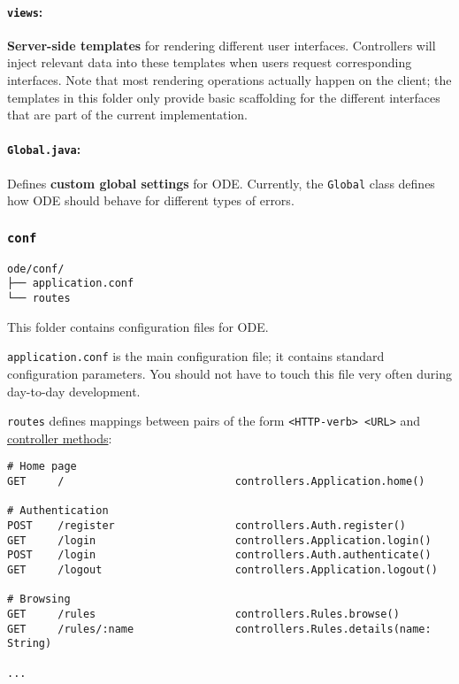\documentclass[11pt]{article}
\begin{document}
\paragraph{\texttt{views}:}
\label{sec-3-3-1-7}
\textbf{Server-side templates} for rendering different user interfaces.
Controllers will inject relevant data into these templates when
users request corresponding interfaces. Note that most rendering
operations actually happen on the client; the templates in this
folder only provide basic scaffolding for the different
interfaces that are part of the current implementation.

\paragraph{\texttt{Global.java}:}
\label{sec-3-3-1-8}
Defines \textbf{custom global settings} for ODE. Currently, the \texttt{Global}
class defines how ODE should behave for different types of
errors.

\subsubsection{\texttt{conf}}
\label{sec-3-3-2}
\begin{verbatim}
ode/conf/
├── application.conf
└── routes
\end{verbatim}

This folder contains configuration files for ODE.

\texttt{application.conf} is the main configuration file; it contains
standard configuration parameters. You should not have to touch
this file very often during day-to-day development.

\texttt{routes} defines mappings between pairs of the form \texttt{<HTTP-verb>
    <URL>} and \href{https://github.com/itsjeyd/ODE#controllers}{controller methods}:

\begin{verbatim}
# Home page
GET     /                           controllers.Application.home()

# Authentication
POST    /register                   controllers.Auth.register()
GET     /login                      controllers.Application.login()
POST    /login                      controllers.Auth.authenticate()
GET     /logout                     controllers.Application.logout()

# Browsing
GET     /rules                      controllers.Rules.browse()
GET     /rules/:name                controllers.Rules.details(name: String)

...
\end{verbatim}
\end{document}
